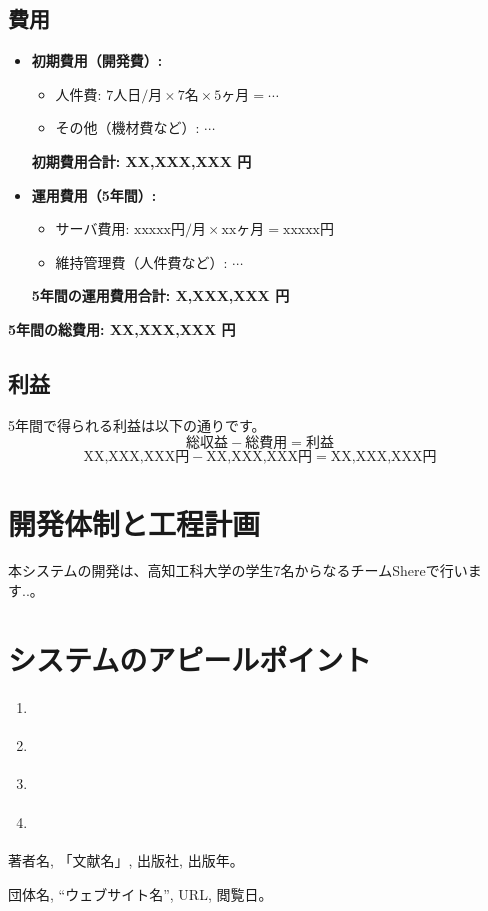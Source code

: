 \documentclass{docs}
\begin{document}
\subsection{費用}
\begin{itemize}
	\item \textbf{初期費用（開発費）:}
		\begin{itemize}
			\item 人件費: $\text{7人日/月}\times\text{7名}\times\text{5ヶ月}
			=\cdots$
			\item その他（機材費など）: $\cdots$
		\end{itemize}
		\textbf{初期費用合計: XX,XXX,XXX 円}
	\item \textbf{運用費用（5年間）:}
		\begin{itemize}
			\item サーバ費用: $\text{xxxxx円/月}\times\text{xxヶ月}
			=\text{xxxxx円}$
			\item 維持管理費（人件費など）: $\cdots$
		\end{itemize}
		\textbf{5年間の運用費用合計: X,XXX,XXX 円}
\end{itemize}
\textbf{5年間の総費用: XX,XXX,XXX 円}

\subsection{利益}
5年間で得られる利益は以下の通りです。
$$
\text{総収益} - \text{総費用} = \text{利益}
$$
$$
\text{XX,XXX,XXX円} - \text{XX,XXX,XXX円} = \text{XX,XXX,XXX円}
$$

\section{開発体制と工程計画}

本システムの開発は、高知工科大学の学生7名からなるチームShereで行います..。



\section{システムのアピールポイント}
\begin{enumerate}
	\item \textbf{}
	\item \textbf{}
	\item \textbf{}
	\item \textbf{}
\end{enumerate}

\begin{thebibliography}{99}
	著者名, 「文献名」, 出版社, 出版年。

	団体名, “ウェブサイト名”, URL, 閲覧日。
\end{thebibliography}
\end{document}
